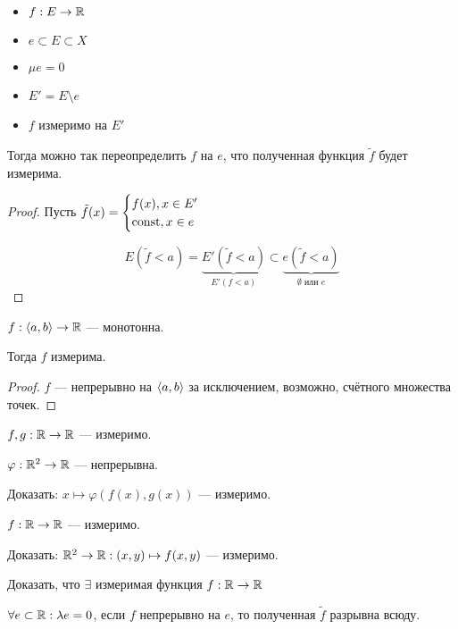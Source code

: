 \begin{corollary}\itemfix
    \begin{itemize}
        \item \(f : E \to \mathbb{R}\)
        \item \(e \subset E \subset X\)
        \item \(\mu e = 0\)
        \item \(E' = E\setminus e\)
        \item \(f\) измеримо на \(E'\)
    \end{itemize}

    Тогда можно так переопределить \(f\) на \(e\), что полученная функция \(\tilde{f}\) будет измерима.
\end{corollary}
\begin{proof}
    Пусть \(\tilde{f}(x) = \begin{cases}
        f(x), x\in E' \\
        \text{const}, x\in e
    \end{cases}\)

    \[E(\tilde{f} < a) = \underbrace{E'(\tilde{f} < a)}_{E'(f < a)} \subset \underbrace{e(\tilde{f} < a)}_{\emptyset \text{ или } e}\]
\end{proof}

\begin{corollary}
    \(f : \langle a, b\rangle \to \mathbb{R}\) --- монотонна.

    Тогда \(f\) измерима.
\end{corollary}
\begin{proof}
    \(f\) --- непрерывно на \(\langle a, b\rangle\) за исключением, возможно, счётного множества точек.
\end{proof}


\begin{exercise}
    \(f, g : \mathbb{R} \to \mathbb{R}\) --- измеримо.

    \(\varphi : \mathbb{R}^2 \to \mathbb{R}\) --- непрерывна.

    Доказать: \(x \mapsto \varphi(f(x), g(x))\) --- измеримо.
\end{exercise}

\begin{exercise}
    \(f : \mathbb{R} \to \mathbb{R}\) --- измеримо.

    Доказать: \(\mathbb{R}^2 \to \mathbb{R} : (x, y) \mapsto f(x, y)\) --- измеримо.
\end{exercise}

\begin{exercise}
    Доказать, что \(\exists \) измеримая функция \(f:\mathbb{R} \to \mathbb{R}\)

    \(\forall e\subset \mathbb{R} : \lambda e = 0\), если \(f\) непрерывно на \(e\), то полученная \(\tilde{f}\) разрывна всюду.
\end{exercise}

